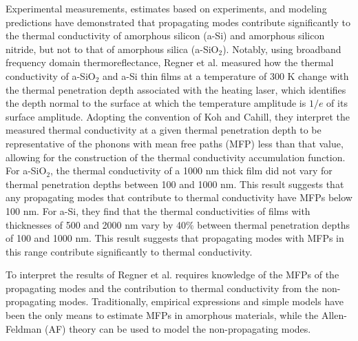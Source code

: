 \documentclass[aps,prb,onecolumn,preprint,superscriptaddress,footinbib,amsmath,amssymb,floatfix]{revtex4}
\begin{document}
Experimental measurements, estimates based on experiments, 
and modeling predictions have demonstrated that propagating modes 
contribute
significantly to the thermal conductivity of amorphous silicon (a-Si)
\cite{feldman_thermal_1993,cahill_thermal_1994,
feldman_numerical_1999,liu_high_2009,yang_anomalously_2010,
he_heat_2011,regner_broadband_2013} 
and amorphous silicon nitride,
\cite{sultan_heat_2013} but not to that of 
amorphous silica (a-SiO$_2$).
\cite{freeman_thermal_1986,graebner_phonon_1986,
cahill_lattice_1988,cahill_thermal_1994,love_estimate_1990,
lee_heat_1997,yamane_measurement_2002,baldi_thermal_2008,
regner_broadband_2013} 
Notably, using broadband frequency domain thermoreflectance, 
Regner et al. measured how the thermal conductivity of a-SiO$_2$ 
and a-Si thin films at a temperature of 300 K change with the 
thermal penetration depth associated with the heating laser, 
which identifies the depth normal to the surface at which the 
temperature amplitude
is $1/e$ of its surface amplitude.\cite{regner_broadband_2013} 
Adopting the convention of Koh and Cahill,\cite{koh_frequency_2007} 
they interpret the measured thermal conductivity at a 
given thermal penetration depth to be representative 
of the phonons with mean free paths (MFP) less than that value, 
allowing for the 
construction of the thermal conductivity accumulation 
function.\cite{dames_thermal_2005,minnich_thermal_2011,
yang_mean_2013} 
For a-SiO$_2$, the thermal conductivity of a 1000 nm thick 
film did not vary for thermal penetration depths between 
100 and 1000 nm. This result suggests 
that any propagating modes that contribute to thermal 
conductivity have MFPs below 100 nm. For a-Si, they find that the 
thermal conductivities of films with thicknesses of 500 and 2000 nm 
vary by 40$\%$ between thermal penetration depths of 
100 and 1000 nm. This result suggests that propagating modes with 
MFPs in this range contribute significantly to thermal conductivity.  

To interpret the results of Regner et al. requires knowledge of 
the MFPs of the 
propagating modes and the contribution to thermal conductivity 
from the non-propagating modes. 
Traditionally, empirical expressions and
simple models have been the only means
to estimate MFPs in amorphous materials,
\cite{zeller_thermal_1971,graebner_phonon_1986,
freeman_thermal_1986,cahill_lattice_1988,cahill_heat_1989} 
while the Allen-Feldman (AF) theory can be used to model the 
non-propagating modes.\cite{allen_thermal_1993,feldman_thermal_1993}
\end{document}
